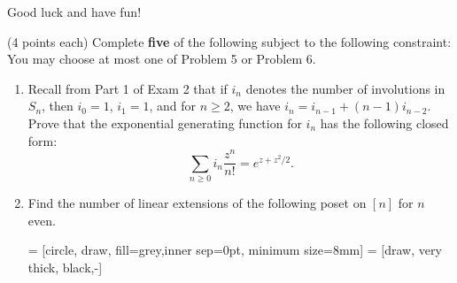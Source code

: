 \documentclass[11pt]{article}
\theoremstyle{definition}
\begin{document}
Good luck and have fun!

\newpage

(4 points each) Complete \textbf{five} of the following subject to the following constraint: You may choose at most one of Problem 5 or Problem 6.

\begin{enumerate}


\item Recall from Part 1 of Exam 2 that if $i_n$ denotes the number of involutions in $S_n$, then $i_0=1$, $i_1=1$, and for $n\geq 2$, we have $i_n=i_{n-1}+(n-1)i_{n-2}$. Prove that the exponential generating function for $i_n$ has the following closed form:
\[
\sum_{n\geq 0}i_n\frac{z^n}{n!}=e^{z+z^2/2}.
\]

\item Find the number of linear extensions of the following poset on $[n]$ for $n$ even.

\bigskip

 = [circle, draw, fill=grey,inner sep=0pt, minimum size=8mm]
 = [draw, very thick, black,-]

\begin{center}
\end{center}


\end{enumerate}
\end{document}
